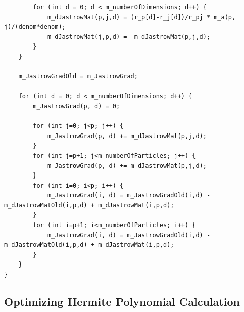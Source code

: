 \documentclass[../main.tex]{subfiles}
\begin{document}
\begin{lstlisting}
        for (int d = 0; d < m_numberOfDimensions; d++) {
            m_dJastrowMat(p,j,d) = (r_p[d]-r_j[d])/r_pj * m_a(p, j)/(denom*denom);
            m_dJastrowMat(j,p,d) = -m_dJastrowMat(p,j,d);
        }
    }

    m_JastrowGradOld = m_JastrowGrad;

    for (int d = 0; d < m_numberOfDimensions; d++) {
        m_JastrowGrad(p, d) = 0;

        for (int j=0; j<p; j++) {
            m_JastrowGrad(p, d) += m_dJastrowMat(p,j,d);
        }
        for (int j=p+1; j<m_numberOfParticles; j++) {
            m_JastrowGrad(p, d) += m_dJastrowMat(p,j,d);
        }
        for (int i=0; i<p; i++) {
            m_JastrowGrad(i, d) = m_JastrowGradOld(i,d) - m_dJastrowMatOld(i,p,d) + m_dJastrowMat(i,p,d);
        }
        for (int i=p+1; i<m_numberOfParticles; i++) {
            m_JastrowGrad(i, d) = m_JastrowGradOld(i,d) - m_dJastrowMatOld(i,p,d) + m_dJastrowMat(i,p,d);
        }
    }
}
\end{lstlisting}


\subsection{Optimizing Hermite Polynomial Calculation}\label{sec:Optimizing Hermite}
\end{document}
